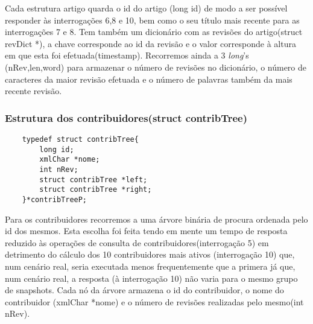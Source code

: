 \documentclass{report}
\begin{document}
Cada estrutura artigo quarda o id do artigo (long id) de modo a ser possível responder às interrogações 6,8 e 10, bem como o seu título mais recente para as interrogações 7 e 8. Tem também um dicionário com as revisões do artigo(struct revDict *), a chave corresponde ao id da revisão e o valor corresponde à altura em que esta foi efetuada(timestamp). Recorremos ainda a 3 \textit{long}'s (nRev,len,word) para armazenar o número de revisões no dicionário, o número de caracteres da maior revisão efetuada e o número de palavras também da mais recente revisão.	

\subsubsection{Estrutura dos contribuidores(struct contribTree)}
\begin{verbatim}
    typedef struct contribTree{
        long id;
        xmlChar *nome;
        int nRev;
        struct contribTree *left;
        struct contribTree *right;
    }*contribTreeP;
\end{verbatim}


Para os contribuidores recorremos a uma árvore binária de procura ordenada pelo id dos mesmos. Esta escolha foi feita tendo em mente um tempo de resposta reduzido às operações de consulta de contribuidores(interrogação 5) em detrimento do cálculo dos 10 contribuidores mais ativos (interrogação 10) que, num cenário real, seria executada menos frequentemente que a primera já que, num cenário real, a resposta (à interrogação 10) não varia para o mesmo grupo de snapshots. Cada nó da árvore armazena o id do contribuidor, o nome do contribuidor (xmlChar *nome) e o número de revisões realizadas pelo mesmo(int nRev).
\end{document}
